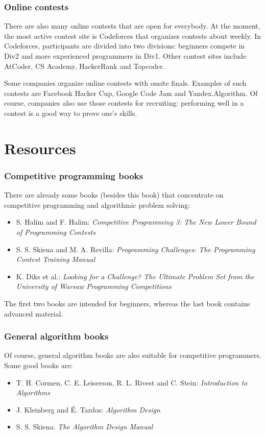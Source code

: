 \subsubsection{Online contests}

There are also many online contests that are open for everybody.
At the moment, the most active contest site is Codeforces
that organizes contests about weekly.
In Codeforces, participants are divided into two divisions:
beginners compete in Div2 and more experienced programmers in Div1.
Other contest sites include AtCoder, CS Academy, HackerRank and Topcoder.

Some companies organize online contests with onsite finals.
Examples of such contests are Facebook Hacker Cup,
Google Code Jam and Yandex.Algorithm.
Of course, companies also use those contests for recruiting:
performing well in a contest is a good way to prove one's skills.

\section{Resources}

\subsubsection{Competitive programming books}

There are already some books (besides this book) that
concentrate on competitive programming and algorithmic problem solving:

\begin{itemize}
\item S. Halim and F. Halim:
\emph{Competitive Programming 3: The New Lower Bound of Programming Contests} \cite{hal13}
\item S. S. Skiena and M. A. Revilla:
\emph{Programming Challenges: The Programming Contest Training Manual} \cite{ski03}
\item K. Diks et al.: \emph{Looking for a Challenge? The Ultimate Problem Set from
the University of Warsaw Programming Competitions} \cite{dik12}
\end{itemize}

The first two books are intended for beginners,
whereas the last book contains advanced material.

\subsubsection{General algorithm books}

Of course, general algorithm books are also suitable for
competitive programmers.
Some good books are:

\begin{itemize}
\item T. H. Cormen, C. E. Leiserson, R. L. Rivest and C. Stein:
\emph{Introduction to Algorithms} \cite{cor09}
\item J. Kleinberg and É. Tardos:
\emph{Algorithm Design} \cite{kle05}
\item S. S. Skiena:
\emph{The Algorithm Design Manual} \cite{ski08}
\end{itemize}
